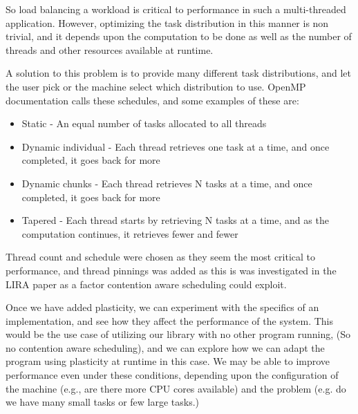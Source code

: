 So load balancing a workload is critical to performance in such a multi-threaded application. However, optimizing the task distribution in this manner is non trivial, and it depends upon the computation to be done as well as the number of threads and other resources available at runtime.

A solution to this problem is to provide many different task distributions, and let the user pick or the machine select which distribution to use. OpenMP documentation calls these schedules, and some examples of these are:

\begin{itemize}
	\item Static - An equal number of tasks allocated to all threads
	\item Dynamic individual - Each thread retrieves one task at a time, and once completed, it goes back for more
	\item Dynamic chunks - Each thread retrieves N tasks at a time, and once completed, it goes back for more
	\item Tapered - Each thread starts by retrieving N tasks at a time, and as the computation continues, it retrieves fewer and fewer
\end{itemize}

Thread count and schedule were chosen as they seem the most critical to performance, and thread pinnings was added as this is was investigated in the LIRA paper \cite{lira} as a factor contention aware scheduling could exploit.

Once we have added plasticity, we can experiment with the specifics of an implementation, and see how they affect the performance of the system. This would be the use case of utilizing our library with no other program running, (So no contention aware scheduling), and we can explore how we can adapt the program using plasticity at runtime in this case. We may be able to improve performance even under these conditions, depending upon the configuration of the machine (e.g., are there more CPU cores available) and the problem (e.g. do we have many small tasks or few large tasks.) 



